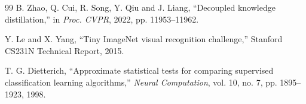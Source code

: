 \documentclass[9pt, conference, a4paper, compsocconf]{IEEEtran}
\begin{document}
\begin{thebibliography}{99}
 B. Zhao, Q. Cui, R. Song, Y. Qiu and J. Liang, ``Decoupled
knowledge distillation,'' in \emph{Proc. CVPR}, 2022, pp. 11953--11962.

 Y. Le and X. Yang, ``Tiny ImageNet visual
recognition challenge,'' Stanford CS231N Technical Report, 2015.

 T. G. Dietterich, ``Approximate statistical tests for
comparing supervised classification learning algorithms,''
\emph{Neural Computation}, vol. 10, no. 7, pp. 1895--1923, 1998.


\end{thebibliography}
\end{document}

